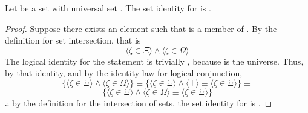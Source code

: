 \documentclass[preview]{standalone}
\begin{document}
\begin{theorem} %
    Let \bm{$\Xi$} be a set with universal set \bm{$\Omega$}. 
    The set identity for \bm{$\Xi$} is \bm{$\Xi \cap \Omega = \Xi$}.
\end{theorem}
\begin{proof}
    Suppose there exists an element \bm{$\zeta$} such that \bm{$\zeta$} is a member of \bm{$\Xi \cap \Omega$}. 
    By the definition for set intersection, that is
    \begin{equation*}
        \Big \langle \zeta \in \Xi \Big \rangle 
            \land 
        \Big \langle \zeta \in \Omega \Big \rangle
    \end{equation*}
    The logical identity for the statement \bm{$\zeta \in \Omega$} is trivially \bm{$\top$}, 
    because \bm{$\Omega$} is the universe. 
    Thus, by that identity, and by the identity law for logical conjunction, 
    \begin{equation*}
        \Bigg\{
            \Big \langle \zeta \in \Xi \Big \rangle 
                \land 
            \Big \langle \zeta \in \Omega \Big \rangle 
        \Bigg\} 
            \equiv
        \Bigg\{
            \Big \langle \zeta \in \Xi \Big \rangle 
                \land 
            \Big \langle \top \Big \rangle 
                \equiv 
            \Big \langle \zeta \in \Xi \Big \rangle
        \Bigg\}
            \equiv
    \end{equation*}
    \begin{equation*}
        \Bigg\{
            \Big \langle \zeta \in \Xi \Big \rangle 
                \land 
            \Big \langle \zeta \in \Omega \Big \rangle
                \equiv
            \Big \langle \zeta \in \Xi \Big \rangle
        \Bigg\}
    \end{equation*}
    $\therefore$ by the definition for the intersection of sets,
    the set identity for \bm{$\Xi$} is \bm{$\Xi \cap \Omega = \Xi$}.
\end{proof}
\end{document}
